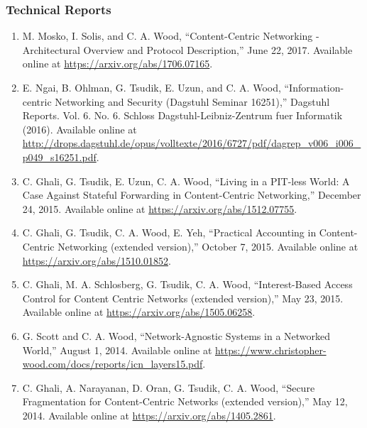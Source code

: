 \documentclass[10pt]{res}
\begin{document}
\begin{resume}

\vspace{-15pt}
\subsubsection*{Technical Reports}
\begin{enumerate}[TR-1.]
    \item M. Mosko, I. Solis, and C. A. Wood, ``Content-Centric Networking - Architectural Overview and Protocol Description,'' June 22, 2017. Available online at \url{https://arxiv.org/abs/1706.07165}.
    \item E. Ngai, B. Ohlman, G. Tsudik, E. Uzun, and C. A. Wood, ``Information-centric Networking and Security (Dagstuhl Seminar 16251),'' Dagstuhl Reports. Vol. 6. No. 6. Schloss Dagstuhl-Leibniz-Zentrum fuer Informatik (2016). Available online at \url{http://drops.dagstuhl.de/opus/volltexte/2016/6727/pdf/dagrep_v006_i006_p049_s16251.pdf}.
    \item C. Ghali, G. Tsudik, E. Uzun, C. A. Wood, ``Living in a PIT-less World: A Case Against Stateful Forwarding in Content-Centric Networking,'' December 24, 2015. Available online at \url{https://arxiv.org/abs/1512.07755}.
    \item C. Ghali, G. Tsudik, C. A. Wood, E. Yeh, ``Practical Accounting in Content-Centric Networking (extended version),'' October 7, 2015. Available online at \url{https://arxiv.org/abs/1510.01852}.
    \item C. Ghali, M. A. Schlosberg, G. Tsudik, C. A. Wood, ``Interest-Based Access Control for Content Centric Networks (extended version),'' May 23, 2015. Available online at \url{https://arxiv.org/abs/1505.06258}.
    \item G. Scott and C. A. Wood, ``Network-Agnostic Systems in a Networked World,'' August 1, 2014. Available online at \url{https://www.christopher-wood.com/docs/reports/icn_layers15.pdf}.
    \item C. Ghali, A. Narayanan, D. Oran, G. Tsudik, C. A. Wood, ``Secure Fragmentation for Content-Centric Networks (extended version),'' May 12, 2014. Available online at \url{https://arxiv.org/abs/1405.2861}.

\end{enumerate}
\end{resume}
\end{document}
